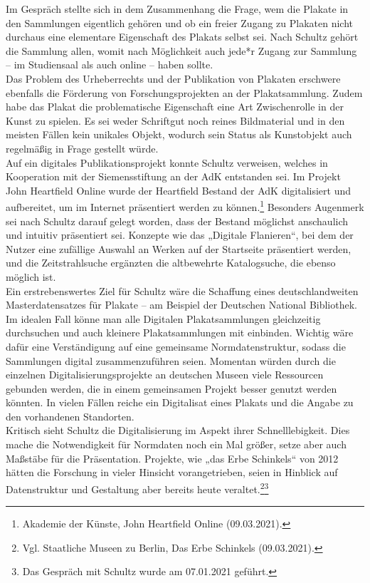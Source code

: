 \documentclass[a4paper,12pt,ngerman]{article}
\begin{document}
Im Gespräch stellte sich in dem Zusammenhang die Frage, wem die Plakate in den Sammlungen eigentlich gehören und ob ein freier Zugang zu Plakaten nicht durchaus eine elementare Eigenschaft des Plakats selbst sei. Nach Schultz gehört die Sammlung allen, womit nach Möglichkeit auch jede*r Zugang zur Sammlung -- im Studiensaal als auch online -- haben sollte. \\
Das Problem des Urheberrechts und der Publikation von Plakaten erschwere ebenfalls die Förderung von Forschungsprojekten an der Plakatsammlung. Zudem habe das Plakat die problematische Eigenschaft eine Art Zwischenrolle in der Kunst zu spielen. Es sei weder Schriftgut noch reines Bildmaterial und in den meisten Fällen kein unikales Objekt, wodurch sein Status als Kunstobjekt auch regelmäßig in Frage gestellt würde. \\
Auf ein digitales Publikationsprojekt konnte Schultz verweisen, welches in Kooperation mit der Siemensstiftung an der AdK entstanden sei. Im Projekt John Heartfield Online wurde der Heartfield Bestand der AdK digitalisiert und aufbereitet, um im Internet präsentiert werden zu können.\footnote{Akademie der Künste, John Heartfield Online (09.03.2021).} Besonders Augenmerk sei nach Schultz darauf gelegt worden, dass der Bestand möglichst anschaulich und intuitiv präsentiert sei. Konzepte wie das „Digitale Flanieren“, bei dem der Nutzer eine zufällige Auswahl an Werken auf der Startseite präsentiert werden, und die Zeitstrahlsuche ergänzten die altbewehrte Katalogsuche, die ebenso möglich ist. \\
Ein erstrebenswertes Ziel für Schultz wäre die Schaffung eines deutschlandweiten Masterdatensatzes für Plakate -- am Beispiel der Deutschen National Bibliothek. Im idealen Fall könne man alle Digitalen Plakatsammlungen gleichzeitig durchsuchen und auch kleinere Plakatsammlungen mit einbinden. Wichtig wäre dafür eine Verständigung auf eine gemeinsame Normdatenstruktur, sodass die Sammlungen digital zusammenzuführen seien. Momentan würden durch die einzelnen Digitalisierungsprojekte an deutschen Museen viele Ressourcen gebunden werden, die in einem gemeinsamen Projekt besser genutzt werden könnten. In vielen Fällen reiche ein Digitalisat eines Plakats und die Angabe zu den vorhandenen Standorten. \\
Kritisch sieht Schultz die Digitalisierung im Aspekt ihrer Schnelllebigkeit. Dies mache die Notwendigkeit für Normdaten noch ein Mal größer, setze aber auch Maßstäbe für die Präsentation. Projekte, wie „das Erbe Schinkels“ von 2012 hätten die Forschung in vieler Hinsicht vorangetrieben, seien in Hinblick auf Datenstruktur und Gestaltung aber bereits heute veraltet.\footnote{Vgl. Staatliche Museen zu Berlin, Das Erbe Schinkels (09.03.2021).}\footnote{Das Gespräch mit Schultz wurde am 07.01.2021 geführt.}
\end{document}

